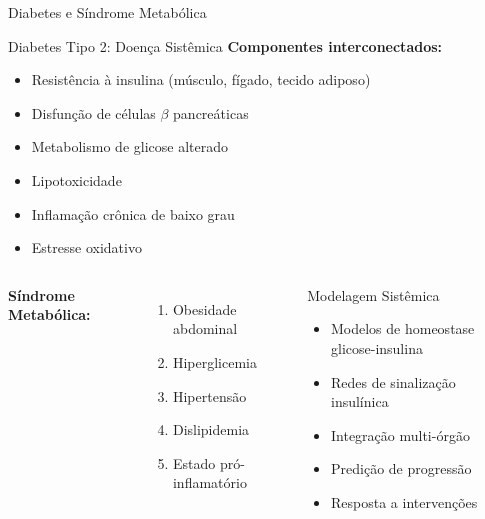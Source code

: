\begin{frame}{Diabetes e Síndrome Metabólica}
\begin{block}{Diabetes Tipo 2: Doença Sistêmica}
\textbf{Componentes interconectados:}
\begin{itemize}
    \item Resistência à insulina (músculo, fígado, tecido adiposo)
    \item Disfunção de células $\beta$ pancreáticas
    \item Metabolismo de glicose alterado
    \item Lipotoxicidade
    \item Inflamação crônica de baixo grau
    \item Estresse oxidativo
\end{itemize}
\end{block}

\vspace{0.3cm}

\begin{columns}
\textbf{Síndrome Metabólica:}
\begin{enumerate}
    \item Obesidade abdominal
    \item Hiperglicemia
    \item Hipertensão
    \item Dislipidemia
    \item Estado pró-inflamatório
\end{enumerate}

\begin{exampleblock}{Modelagem Sistêmica}
\begin{itemize}
    \item Modelos de homeostase glicose-insulina
    \item Redes de sinalização insulínica
    \item Integração multi-órgão
    \item Predição de progressão
    \item Resposta a intervenções
\end{itemize}
\end{exampleblock}
\end{columns}
\end{frame}

